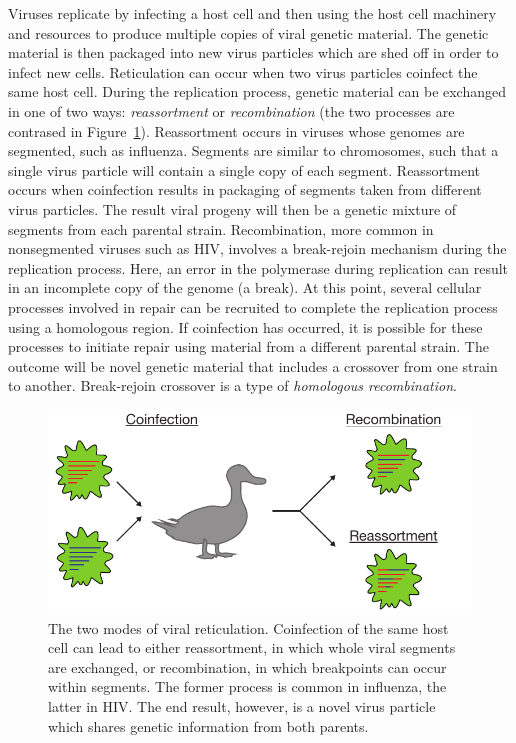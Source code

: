 Viruses replicate by infecting a host cell and then using the host cell machinery and resources to produce multiple copies of viral genetic material.
The genetic material is then packaged into new virus particles which are shed off in order to infect new cells.
Reticulation can occur when two virus particles coinfect the same host cell.
During the replication process, genetic material can be exchanged in one of two ways: \emph{reassortment} or \emph{recombination} (the two processes are contrased in Figure~\ref{fig:viral_reticulation}).
Reassortment occurs in viruses whose genomes are segmented, such as influenza.
Segments are similar to chromosomes, such that a single virus particle will contain a single copy of each segment.
Reassortment occurs when coinfection results in packaging of segments taken from different virus particles.
The result viral progeny will then be a genetic mixture of segments from each parental strain.
Recombination, more common in nonsegmented viruses such as HIV, involves a break-rejoin mechanism during the replication process.
Here, an error in the polymerase during replication can result in an incomplete copy of the genome (a break).
At this point, several cellular processes involved in repair can be recruited to complete the replication process using a homologous region.
If coinfection has occurred, it is possible for these processes to initiate repair using material from a different parental strain.
The outcome will be novel genetic material that includes a crossover from one strain to another.
Break-rejoin crossover is a type of \emph{homologous recombination}.

\begin{figure}
\centering
\includegraphics[]{./fig/background/viral_reticulation.pdf}
\caption[Viral recombination and reassortment]{The two modes of viral reticulation. Coinfection of the same host cell can lead to either reassortment, in which whole viral segments are exchanged, or recombination, in which breakpoints can occur within segments. The former process is common in influenza, the latter in HIV. The end result, however, is a novel virus particle which shares genetic information from both parents.}
\label{fig:viral_reticulation}
\end{figure}

